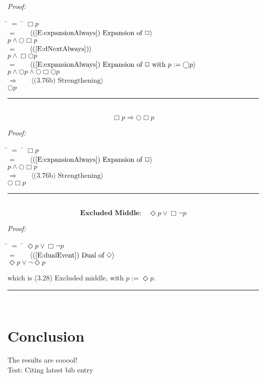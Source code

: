 \documentclass[fleqn, leqno]{article}
\newcommand{\lgap}{2pt}                             %
\newcommand{\mymathindent}{24pt}                      %
\newcommand{\next}{\bigcirc}
\newcommand{\event}{\Diamond}
\newcommand{\always}{\Box}
\newcommand{\myqed}{\hfill\rule[-.23ex]{1.2ex}{2.0ex}}
\newcommand{\Gll} {\langle}                         %
\newcommand{\Ggg} {\rangle}                         %
\newcommand{\Hint}[1]     {\ \ \ $\Gll              \mbox{#1} \Ggg$ }   %
\begin{document}
\emph{Proof:}
\begin{tabbing}
\hspace{\mymathindent} \= $= \;$ \= \kill
  \> \>   $\always p$\\[\lgap]
  \> $=$  \>  \Hint{(\ref{E:expansionAlways}) Expansion of $\always$}\\[\lgap]
  \> \>   $p \land \next\always p$\\[\lgap]
  \> $=$  \>  \Hint{(\ref{E:dNextAlways})}\\[\lgap]
  \> \>   $p \land \always\next p$\\[\lgap]
  \> $=$  \>  \Hint{(\ref{E:expansionAlways}) Expansion of $\always$ with $p := \next p$}\\[\lgap]
  \> \>   $p \land \next p \land \next\always\next p$\\[\lgap]
  \> $\Rightarrow$  \>  \Hint{(3.76b) Strengthening}\\[\lgap]
  \> \>   $\next p$\\[\lgap]
\end{tabbing}
\myqed\\[\lgap]


\begin{equation}\label{E:impAlwaysNA}
\always p \Rightarrow \next\always p
\end{equation}

\emph{Proof:}
\begin{tabbing}
\hspace{\mymathindent} \= $= \;$ \= \kill
  \> \>   $\always p$\\[\lgap]
  \> $=$  \>  \Hint{(\ref{E:expansionAlways}) Expansion of $\always$}\\[\lgap]
  \> \>   $p \land \next\always p$\\[\lgap]
  \> $\Rightarrow$  \>  \Hint{(3.76b) Strengthening}\\[\lgap]
  \> \>   $\next\always p$\\[\lgap]
\end{tabbing}
\myqed\\[\lgap]


\begin{equation}\label{E:excludedMid}
\textbf{Excluded Middle:}\quad \event p \lor \always\lnot p
\end{equation}

\emph{Proof:}
\begin{tabbing}
\hspace{\mymathindent} \= $= \;$ \= \kill
  \> \>   $\event p \lor \always\lnot p$\\[\lgap]
  \> $=$  \>  \Hint{(\ref{E:dualEvent}) Dual of $\event$}\\[\lgap]
  \> \>   $\event p \lor \lnot\event p$\\[\lgap]
\end{tabbing}
which is (3.28) Excluded middle, with $p := \event p$. \myqed\\[\lgap]




\section*{Conclusion}

The results are cooool!\\

Test: Citing latest bib entry\cite{GandS}\\



\end{document}
